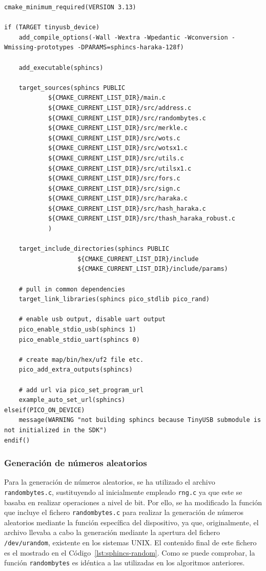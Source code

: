 \begin{lstlisting}[label={lst:sphincs-make},style=Cnice,firstnumber=1,caption={Archivo \texttt{Sphincs/CMakeLists.txt}.}]
cmake_minimum_required(VERSION 3.13)

if (TARGET tinyusb_device)    
    add_compile_options(-Wall -Wextra -Wpedantic -Wconversion -Wmissing-prototypes -DPARAMS=sphincs-haraka-128f)

    add_executable(sphincs)

    target_sources(sphincs PUBLIC
            ${CMAKE_CURRENT_LIST_DIR}/main.c
            ${CMAKE_CURRENT_LIST_DIR}/src/address.c
            ${CMAKE_CURRENT_LIST_DIR}/src/randombytes.c
            ${CMAKE_CURRENT_LIST_DIR}/src/merkle.c
            ${CMAKE_CURRENT_LIST_DIR}/src/wots.c
            ${CMAKE_CURRENT_LIST_DIR}/src/wotsx1.c
            ${CMAKE_CURRENT_LIST_DIR}/src/utils.c
            ${CMAKE_CURRENT_LIST_DIR}/src/utilsx1.c
            ${CMAKE_CURRENT_LIST_DIR}/src/fors.c
            ${CMAKE_CURRENT_LIST_DIR}/src/sign.c
            ${CMAKE_CURRENT_LIST_DIR}/src/haraka.c
            ${CMAKE_CURRENT_LIST_DIR}/src/hash_haraka.c
            ${CMAKE_CURRENT_LIST_DIR}/src/thash_haraka_robust.c
            )
    
    target_include_directories(sphincs PUBLIC
                    ${CMAKE_CURRENT_LIST_DIR}/include
                    ${CMAKE_CURRENT_LIST_DIR}/include/params)

    # pull in common dependencies
    target_link_libraries(sphincs pico_stdlib pico_rand)

    # enable usb output, disable uart output
    pico_enable_stdio_usb(sphincs 1)
    pico_enable_stdio_uart(sphincs 0)

    # create map/bin/hex/uf2 file etc.
    pico_add_extra_outputs(sphincs)

    # add url via pico_set_program_url
    example_auto_set_url(sphincs)
elseif(PICO_ON_DEVICE)
    message(WARNING "not building sphincs because TinyUSB submodule is not initialized in the SDK")
endif()
\end{lstlisting}

\subsubsection{Generación de números aleatorios}\label{subsubsec:sphincs-random}

Para la generación de números aleatorios, se ha utilizado el archivo \texttt{randombytes.c}, sustituyendo al inicialmente empleado \texttt{rng.c} ya que este se basaba en realizar operaciones a nivel de bit.
Por ello, se ha modificado la función que incluye el fichero \texttt{randombytes.c} para realizar la generación de números aleatorios mediante la función específica del dispositivo, ya que, originalmente, el archivo llevaba a cabo la generación mediante la apertura del fichero \texttt{/dev/urandom}, existente en los sistemas UNIX.
El contenido final de este fichero es el mostrado en el Código~\ref{lst:sphincs-random}.
Como se puede comprobar, la función \texttt{randombytes} es idéntica a las utilizadas en los algoritmos anteriores.


